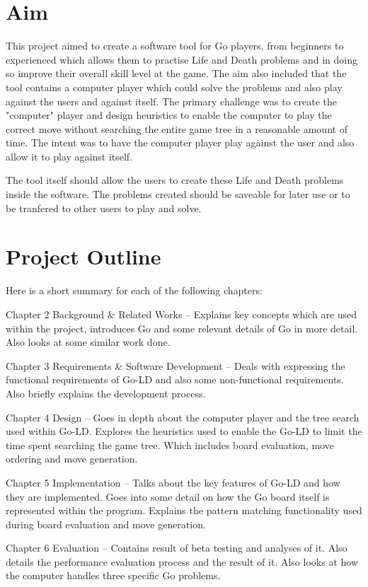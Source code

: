 \documentclass{l4proj}
\begin{document}
\section{Aim}
This project aimed to create a software tool for Go players, from beginners to experienced which allows them to practise Life and Death problems and in doing so improve their overall skill level at the game.  The aim also included that the tool contains a computer player which could solve the problems and also play against the users and against itself. The primary challenge was to create the  "computer" player and design heuristics to enable the computer to play the correct move without searching the entire game tree in a reasonable amount of time. The intent was to have the computer player play against the user and also allow it to play against itself.

The tool itself should allow the users to create these Life and Death problems inside the software. The problems created should be saveable for later use or to be tranfered to other users to play and solve.

\section{Project Outline}

Here is a short summary for each of the following chapters:

Chapter 2 Background \& Related Works – Explains key concepts which are used within the project, introduces Go and some relevant details of Go in more detail. Also looks at some similar work done.

Chapter 3 Requirements \& Software Development – Deals with expressing the functional requirements of Go-LD and also some non-functional requirements. Also briefly explains the development process.


Chapter 4 Design – Goes in depth about the computer player and the tree search used within Go-LD.  Explores the heuristics used to enable the Go-LD to limit the time spent searching the game tree. Which includes board evaluation, move ordering and move generation.

Chapter 5 Implementation – Talks about the key features of Go-LD and how they are implemented. Goes into some detail on how the Go board itself is represented within the program. Explains the pattern matching functionality used during board evaluation and move generation.

Chapter 6 Evaluation – Contains result of beta testing and analyses of it. Also details the performance evaluation process and the result of it. Also looks at how the computer handles three specific Go problems.
\end{document}
